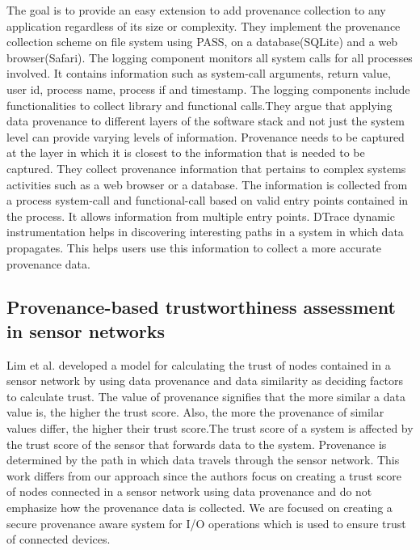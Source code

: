 The goal is to provide an easy extension to add provenance collection to any application regardless of its size or complexity. They implement the provenance collection scheme on file system using PASS, on a database(SQLite) and a web browser(Safari). 
The logging component monitors all system calls for all processes involved. It contains information such as system-call arguments, return value, user id, process name, process if and timestamp. The logging components include functionalities to collect library and functional calls.They argue that applying data provenance to different layers of the software stack and not just the system level can provide varying levels of information.  Provenance needs to be captured at the layer in which it is closest to the information that is needed to be captured. They collect provenance information that pertains to complex systems activities such as a web browser or a database. The information is collected from a process system-call and functional-call based on valid entry points contained in the process. It allows information from multiple entry points. DTrace dynamic instrumentation helps in discovering interesting paths in a system in which data propagates. This helps users use this information to collect a more accurate provenance data.


\subsection{Provenance-based trustworthiness assessment in sensor networks}
Lim et al. \cite{lim} developed a
model for calculating the trust of nodes contained in a sensor network by using data
provenance and data similarity as deciding factors to calculate trust. The value of
provenance signifies that the more similar a data value is, the higher the trust score.
Also, the more the provenance of similar values differ, the higher their trust score.The trust score of a system is affected by the trust score of the sensor that forwards data to the system. Provenance is determined by the path in which data travels through the sensor network. This work differs from our approach since the authors focus on creating a trust score
of nodes connected in a sensor network using data provenance and do not emphasize
how the provenance data is collected. We are focused on creating a secure
provenance aware system for I/O operations which is used to ensure trust of
connected devices. 


